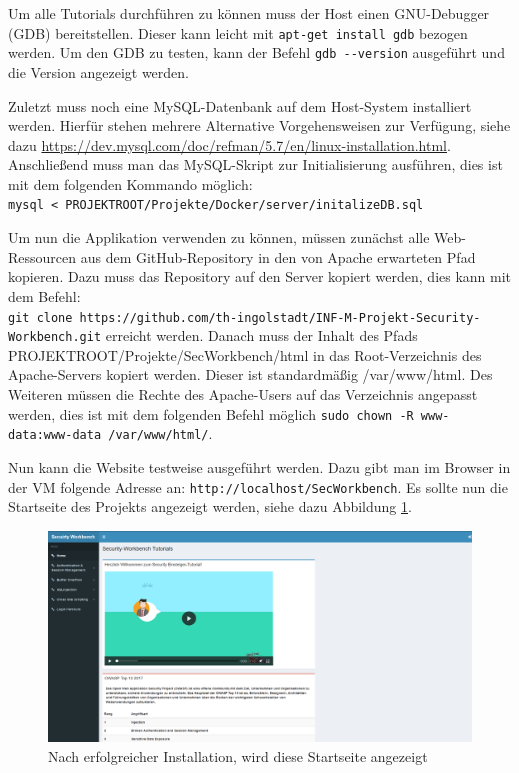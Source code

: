 Um alle Tutorials durchführen zu können muss der Host einen GNU-Debugger (GDB) bereitstellen. Dieser kann leicht mit  \colorbox{altgray}{\lstinline|apt-get install gdb|} bezogen werden. Um den GDB zu testen, kann der Befehl \colorbox{altgray}{\lstinline|gdb --version|} ausgeführt und die Version angezeigt werden.\medskip

Zuletzt muss noch eine MySQL-Datenbank auf dem Host-System installiert werden. Hierfür stehen mehrere Alternative Vorgehensweisen zur Verfügung, siehe dazu \url{https://dev.mysql.com/doc/refman/5.7/en/linux-installation.html}. Anschließend muss man das MySQL-Skript zur Initialisierung ausführen, dies ist mit dem folgenden Kommando möglich:\\ \colorbox{altgray}{\lstinline|mysql < PROJEKTROOT/Projekte/Docker/server/initalizeDB.sql|} \medskip

Um nun die Applikation verwenden zu können, müssen zunächst alle Web-Ressourcen aus dem GitHub-Repository in den von Apache erwarteten Pfad kopieren. Dazu muss das Repository auf den Server kopiert werden, dies kann mit dem Befehl:\\ \colorbox{altgray}{\lstinline|git clone https://github.com/th-ingolstadt/INF-M-Projekt-Security-Workbench.git|} erreicht werden. Danach muss der Inhalt des Pfads PROJEKTROOT/Projekte/SecWorkbench/html in das Root-Verzeichnis des Apache-Servers kopiert werden. Dieser ist standardmäßig /var/www/html. Des Weiteren müssen die Rechte des Apache-Users auf das Verzeichnis angepasst werden, dies ist mit dem folgenden Befehl möglich \colorbox{altgray}{\lstinline|sudo chown -R www-data:www-data /var/www/html/|}.\medskip

Nun kann die Website testweise ausgeführt werden. Dazu gibt man im Browser in der VM folgende Adresse an:  \colorbox{altgray}{\lstinline|http://localhost/SecWorkbench|}. Es sollte nun die Startseite des Projekts angezeigt werden, siehe dazu Abbildung \ref{fig:startseite}.

\begin{figure}[H]
	\centering
	\includegraphics[width=\textwidth]{images/Installation/startseite.png}
	\caption{Nach erfolgreicher Installation, wird diese Startseite angezeigt}
	\label{fig:startseite}
\end{figure}

